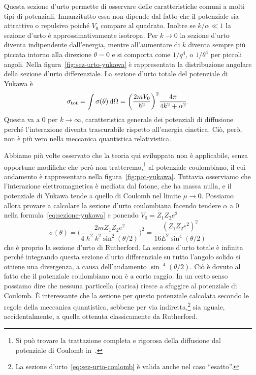 \documentclass[a4paper,fleqn,twoside,12pt]{article}
\newcommand*{\dd}{\mathop{}\!\mathrm{d}} %
\begin{document}
Questa sezione d'urto permette di osservare delle caratteristiche comuni a molti
tipi di potenziali.  Innanzitutto essa non dipende dal fatto che il potenziale
sia attrattivo o repulsivo poiché $V_{0}$ compare al quadrato.  Inoltre se
$k/\alpha \ll 1$ la sezione d'urto è approssimativamente isotropa.  Per
$k \to 0$ la sezione d'urto diventa indipendente dall'energia, mentre
all'aumentare di $k$ diventa sempre più piccata intorno alla direzione
$\theta = 0$ e si comporta come $1/q^{4}$, o $1/\theta^{4}$ per piccoli angoli.
Nella figura~\ref{fig:sez-urto-yukawa} è rappresentata la distribuzione angolare
della sezione d'urto differenziale.  La sezione d'urto totale del potenziale di
Yukawa è
\begin{equation}
  \sigma_{\textup{tot}} = \int \sigma(\theta) \dd\Omega =
  \bigg(\frac{2mV_{0}}{\hslash^{2}}\bigg)^{2} \frac{4\pi}{4k^{2} + \alpha^{2}}.
\end{equation}
Questa va a $0$ per $k \to \infty$, caratteristica generale dei potenziali di
diffusione perché l'interazione diventa trascurabile rispetto all'energia
cinetica.  Ciò, però, non è più vero nella meccanica quantistica relativistica.

Abbiamo più volte osservato che la teoria qui sviluppata non è applicabile,
senza opportune modifiche che però non
tratteremo,\footnote{Si può trovare la trattazione completa e rigorosa della
  diffusione dal potenziale di Coulomb
  in~\textcite[368-373]{gottfried:quantum-mechanics}.}
al potenziale coulombiano, il cui andamento è rappresentato nella
figura~\ref{fig:pot-yukawa}.  Tuttavia osserviamo che l'interazione
elettromagnetica è mediata dal fotone, che ha massa nulla, e il potenziale di
Yukawa tende a quello di Coulomb nel limite $\mu \to 0$.  Possiamo allora
provare a calcolare la sezione d'urto coulombiana facendo tendere $\alpha$ a $0$
nella formula~\eqref{eq:sezione-yukawa} e ponendo $V_{0} = Z_{1}Z_{2}e^{2}$
\begin{equation}
  \label{eq:sez-urto-coulomb}
  \sigma(\theta) =
  \bigg(\frac{2mZ_{1}Z_{2}e^{2}}{4\hslash^{2}k^{2}\sin^{2}(\theta/2)}\bigg)^{2}=
  \frac{(Z_{1}Z_{2}e^{2})^{2}}{16E^{2}\sin^{4}(\theta/2)}
\end{equation}
che è proprio la sezione d'urto di Rutherford.  La sezione d'urto totale è
infinita perché integrando questa sezione d'urto differenziale su tutto l'angolo
solido si ottiene una divergenza, a causa dell'andamento $\sin^{-4}(\theta/2)$.
Ciò è dovuto al fatto che il potenziale coulombiano non è a corto raggio.  In un
certo senso possiamo dire che nessuna particella (carica) riesce a sfuggire al
potenziale di Coulomb.  È interessante che la sezione per questo potenziale
calcolata secondo le regole della meccanica quantistica, sebbene per via
indiretta,\footnote{La sezione d'urto~\eqref{eq:sez-urto-coulomb} è valida anche
  nel caso ``esatto''.}
sia uguale, accidentalmente, a quella ottenuta classicamente da Rutherford.
\end{document}
